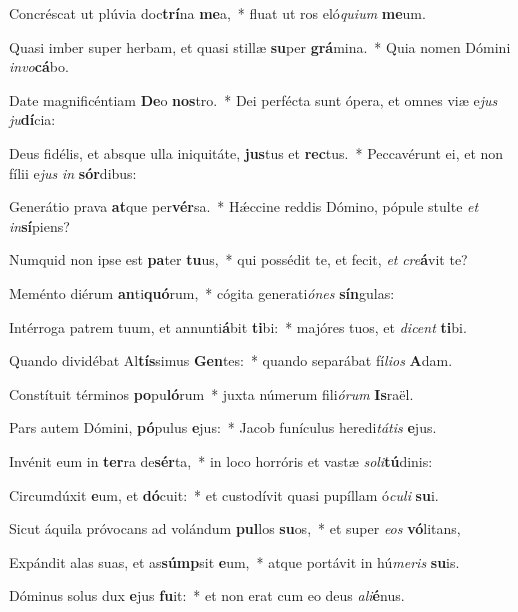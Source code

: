 \item Concréscat ut plúvia doc\textbf{trí}na \textbf{me}a,~* fluat ut ros eló\textit{qui}\textit{um} \textbf{me}um.
\item Quasi imber super herbam, et quasi stillæ \textbf{su}per \textbf{grá}mina.~* Quia nomen Dómini \textit{in}\textit{vo}\textbf{cá}bo.
\item Date magnificéntiam \textbf{De}o \textbf{nos}tro.~* Dei perfécta sunt ópera, et omnes viæ e\textit{jus} \textit{ju}\textbf{dí}cia:
\item Deus fidélis, et absque ulla iniquitáte, \textbf{jus}tus et \textbf{rec}tus.~* Peccavérunt ei, et non fílii e\textit{jus} \textit{in} \textbf{sór}dibus:
\item Generátio prava \textbf{at}que per\textbf{vér}sa.~* Hǽccine reddis Dómino, pópule stulte \textit{et} \textit{in}\textbf{sí}piens?
\item Numquid non ipse est \textbf{pa}ter \textbf{tu}us,~* qui possédit te, et fecit, \textit{et} \textit{cre}\textbf{á}vit te?
\item Meménto diérum \textbf{an}ti\textbf{quó}rum,~* cógita generati\textit{ó}\textit{nes} \textbf{sín}gulas:
\item Intérroga patrem tuum, et annunti\textbf{á}bit \textbf{ti}bi:~* majóres tuos, et \textit{di}\textit{cent} \textbf{ti}bi.
\item Quando dividébat Al\textbf{tís}simus \textbf{Gen}tes:~* quando separábat fí\textit{li}\textit{os} \textbf{A}dam.
\item Constítuit términos \textbf{po}pu\textbf{ló}rum~* juxta númerum fili\textit{ó}\textit{rum} \textbf{Is}raël.
\item Pars autem Dómini, \textbf{pó}pulus \textbf{e}jus:~* Jacob funículus heredi\textit{tá}\textit{tis} \textbf{e}jus.
\item Invénit eum in \textbf{ter}ra de\textbf{sér}ta,~* in loco horróris et vastæ \textit{so}\textit{li}\textbf{tú}dinis:
\item Circumdúxit \textbf{e}um, et \textbf{dó}cuit:~* et custodívit quasi pupíllam ó\textit{cu}\textit{li} \textbf{su}i.
\item Sicut áquila próvocans ad volándum \textbf{pul}los \textbf{su}os,~* et super \textit{e}\textit{os} \textbf{vó}litans,
\item Expándit alas suas, et as\textbf{súmp}sit \textbf{e}um,~* atque portávit in hú\textit{me}\textit{ris} \textbf{su}is.
\item Dóminus solus dux \textbf{e}jus \textbf{fu}it:~* et non erat cum eo deus \textit{a}\textit{li}\textbf{é}nus.
